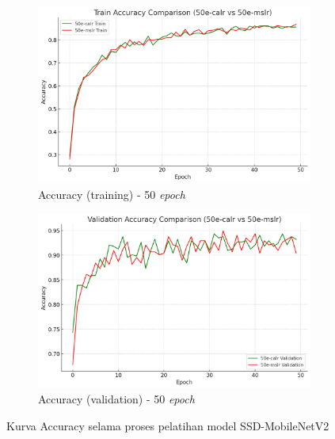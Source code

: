 \begin{figure}[htbp]
\begin{subfigure}{0.45\textwidth}
    \includegraphics[width=\textwidth]{gambar/bab4-train-acc-50e.png}
    \caption{Accuracy (training) - 50 \emph{epoch}}
  \end{subfigure}
  \hfill
  \begin{subfigure}{0.45\textwidth}
    \includegraphics[width=\textwidth]{gambar/bab4-val-acc-50e.png}
    \caption{Accuracy (validation) - 50 \emph{epoch}}
  \end{subfigure}
  \caption{Kurva Accuracy selama proses pelatihan model SSD-MobileNetV2}
  \label{fig:accuracy_curves}
\end{figure}

